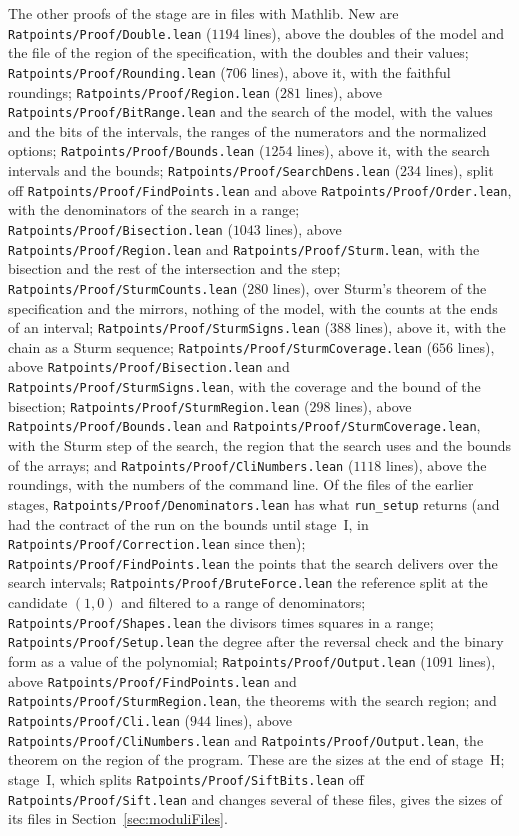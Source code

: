 The other proofs of the stage are in files with Mathlib. New are \verb|Ratpoints/Proof/Double.lean|
($1194$ lines), above the doubles of the model and the file of the region of the specification, with
the doubles and their values; \verb|Ratpoints/Proof/Rounding.lean| ($706$ lines), above it, with the
faithful roundings; \verb|Ratpoints/Proof/Region.lean| ($281$ lines), above
\verb|Ratpoints/Proof/BitRange.lean| and the search of the model, with the values and the bits of
the intervals, the ranges of the numerators and the normalized options;
\verb|Ratpoints/Proof/Bounds.lean| ($1254$ lines), above it, with the search intervals and the
bounds; \verb|Ratpoints/Proof/SearchDens.lean| ($234$ lines), split off
\verb|Ratpoints/Proof/FindPoints.lean| and above \verb|Ratpoints/Proof/Order.lean|, with the
denominators of the search in a range; \verb|Ratpoints/Proof/Bisection.lean| ($1043$ lines), above
\verb|Ratpoints/Proof/Region.lean| and \verb|Ratpoints/Proof/Sturm.lean|, with the bisection and the
rest of the intersection and the step; \verb|Ratpoints/Proof/SturmCounts.lean| ($280$ lines), over
Sturm's theorem of the specification and the mirrors, nothing of the model, with the counts at the
ends of an interval; \verb|Ratpoints/Proof/SturmSigns.lean| ($388$ lines), above it, with the chain
as a Sturm sequence; \verb|Ratpoints/Proof/SturmCoverage.lean| ($656$ lines), above
\verb|Ratpoints/Proof/Bisection.lean| and \verb|Ratpoints/Proof/SturmSigns.lean|, with the coverage
and the bound of the bisection; \verb|Ratpoints/Proof/SturmRegion.lean| ($298$ lines), above
\verb|Ratpoints/Proof/Bounds.lean| and \verb|Ratpoints/Proof/SturmCoverage.lean|, with the Sturm
step of the search, the region that the search uses and the bounds of the arrays; and
\verb|Ratpoints/Proof/CliNumbers.lean| ($1118$ lines), above the roundings, with the numbers of the
command line. Of the files of the earlier stages, \verb|Ratpoints/Proof/Denominators.lean| has what
\verb|run_setup| returns (and had the contract of the run on the bounds until stage~I, in
\verb|Ratpoints/Proof/Correction.lean| since then); \verb|Ratpoints/Proof/FindPoints.lean| the
points that the search delivers over the search intervals; \verb|Ratpoints/Proof/BruteForce.lean|
the reference split at the candidate $(1, 0)$ and filtered to a range of denominators;
\verb|Ratpoints/Proof/Shapes.lean| the divisors times squares in a range;
\verb|Ratpoints/Proof/Setup.lean| the degree after the reversal check and the binary form as a value
of the polynomial; \verb|Ratpoints/Proof/Output.lean| ($1091$ lines), above
\verb|Ratpoints/Proof/FindPoints.lean| and \verb|Ratpoints/Proof/SturmRegion.lean|, the theorems
with the search region; and \verb|Ratpoints/Proof/Cli.lean| ($944$ lines), above
\verb|Ratpoints/Proof/CliNumbers.lean| and \verb|Ratpoints/Proof/Output.lean|, the theorem on the
region of the program. These are the sizes at the end of stage~H; stage~I, which splits
\verb|Ratpoints/Proof/SiftBits.lean| off \verb|Ratpoints/Proof/Sift.lean| and changes several of
these files, gives the sizes of its files in Section~\ref{sec:moduliFiles}.

